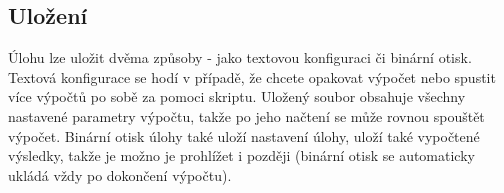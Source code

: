 \documentclass[a4paper,12pt]{article}
\begin{document}
\subsection{Uložení}
\begin{figure}[H]
\end{figure}
Úlohu lze uložit dvěma způsoby - jako textovou konfiguraci či binární otisk. Textová konfigurace se hodí v případě, že chcete opakovat výpočet nebo spustit více výpočtů po sobě za pomoci skriptu. Uložený soubor obsahuje všechny nastavené parametry výpočtu, takže po jeho načtení se může rovnou spouštět výpočet. Binární otisk úlohy také uloží nastavení úlohy, uloží také vypočtené výsledky, takže je možno je prohlížet i později (binární otisk se automaticky ukládá vždy po dokončení výpočtu).
\newpage
\end{document}
